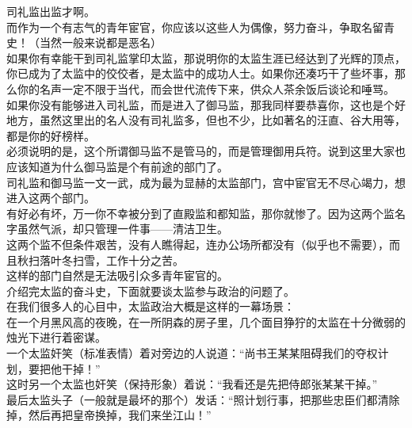 \begin{multicols}{\theparacolNo}
司礼监出监才啊。\\

而作为一个有志气的青年宦官，你应该以这些人为偶像，努力奋斗，争取名留青史！（当然一般来说都是恶名）\\

如果你有幸能干到司礼监掌印太监，那说明你的太监生涯已经达到了光辉的顶点，你已成为了太监中的佼佼者，是太监中的成功人士。如果你还凑巧干了些坏事，那么你的名声一定不限于当代，而会世代流传下来，供众人茶余饭后谈论和唾骂。\\

如果你没有能够进入司礼监，而是进入了御马监，那我同样要恭喜你，这也是个好地方，虽然这里出的名人没有司礼监多，但也不少，比如著名的汪直、谷大用等，都是你的好榜样。\\

必须说明的是，这个所谓御马监不是管马的，而是管理御用兵符。说到这里大家也应该知道为什么御马监是个有前途的部门了。\\

司礼监和御马监一文一武，成为最为显赫的太监部门，宫中宦官无不尽心竭力，想进入这两个部门。\\

有好必有坏，万一你不幸被分到了直殿监和都知监，那你就惨了。因为这两个监名字虽然气派，却只管理一件事——清洁卫生。\\

这两个监不但条件艰苦，没有人瞧得起，连办公场所都没有（似乎也不需要），而且秋扫落叶冬扫雪，工作十分之苦。\\

这样的部门自然是无法吸引众多青年宦官的。\\

介绍完太监的奋斗史，下面就要谈太监参与政治的问题了。\\

在我们很多人的心目中，太监政治大概是这样的一幕场景：\\

在一个月黑风高的夜晚，在一所阴森的房子里，几个面目狰狞的太监在十分微弱的烛光下进行着密谋。\\

一个太监奸笑（标准表情）着对旁边的人说道：“尚书王某某阻碍我们的夺权计划，要把他干掉！”\\

这时另一个太监也奸笑（保持形象）着说：“我看还是先把侍郎张某某干掉。”\\

最后太监头子（一般就是最坏的那个）发话：“照计划行事，把那些忠臣们都清除掉，然后再把皇帝换掉，我们来坐江山！”\\


\end{multicols}
